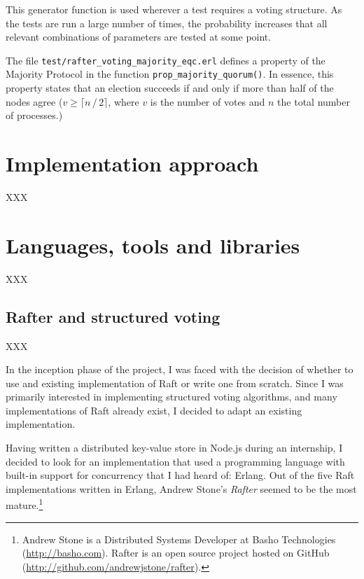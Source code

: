 \documentclass[11pt,chapterprefix=true,toc=bibliography,numbers=noendperiod,
               footnotes=multiple,twoside]{scrreprt}
\begin{document}
This generator function is used wherever a test requires a voting structure. As the tests are run a large number of times, the probability increases that all relevant combinations of parameters are tested at some point.


The file \texttt{test/rafter\_voting\_majority\_eqc.erl} defines a property of the Majority Protocol in the function \texttt{prop\_majority\_quorum()}. In essence, this property states that an election succeeds if and only if more than half of the nodes agree (\(v \ge \lceil n \, / \, 2 \rceil \), where \(v\) is the number of votes and \(n\) the total number of processes.)

\section{Implementation approach\label{sc:implementation-strategy}}

XXX

\section{Languages, tools and libraries\label{sc:tools}}

XXX

\subsection{Rafter and structured voting\label{ssc:rafter-structured-voting}}

XXX

In the inception phase of the project, I was faced with the decision of whether to use and existing implementation of Raft or write one from scratch. Since I was primarily interested in implementing structured voting algorithms, and many implementations of Raft already exist, I decided to adapt an existing implementation.

Having written a distributed key-value store in Node.js during an internship, I decided to look for an implementation that used a programming language with built-in support for concurrency that I had heard of: Erlang. Out of the five Raft implementations written in Erlang, Andrew Stone's \emph{Rafter} seemed to be the most mature.\footnote{Andrew Stone is a Distributed Systems Developer at Basho Technologies (\url{http://basho.com}). Rafter is an open source project hosted on GitHub (\url{http://github.com/andrewjstone/rafter}).}
\end{document}
